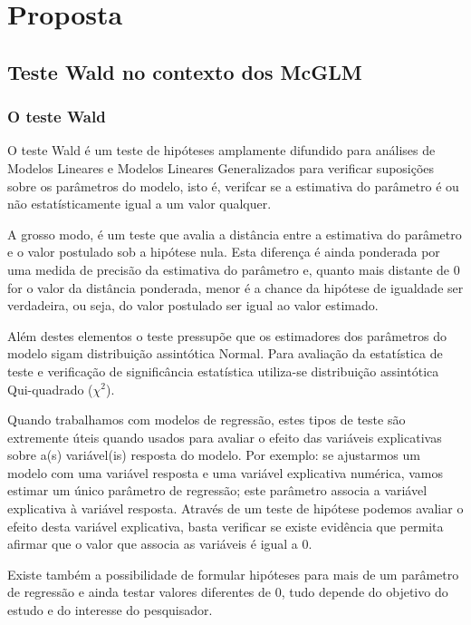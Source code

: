 
\chapter{Proposta}

\label{cap:proposta}

\section{Teste Wald no contexto dos McGLM}


\subsection{O teste Wald}

O teste Wald é um teste de hipóteses amplamente difundido para análises de Modelos Lineares e Modelos Lineares Generalizados para verificar suposições sobre os parâmetros do modelo, isto é, verifcar se a estimativa do parâmetro é ou não estatísticamente igual a um valor qualquer.

A grosso modo, é um teste que avalia a distância entre a estimativa do parâmetro e o valor postulado sob a hipótese nula. Esta diferença é ainda ponderada por uma medida de precisão da estimativa do parâmetro e, quanto mais distante de 0 for o valor da distância ponderada, menor é a chance da hipótese de igualdade ser verdadeira, ou seja, do valor postulado ser igual ao valor estimado.

Além destes elementos o teste pressupõe que os estimadores dos parâmetros do modelo sigam distribuição assintótica Normal. Para avaliação da estatística de teste e verificação de significância estatística utiliza-se distribuição assintótica Qui-quadrado ($\chi^2$).

Quando trabalhamos com modelos de regressão, estes tipos de teste são extremente úteis quando usados para avaliar o efeito das variáveis explicativas sobre a(s) variável(is) resposta do modelo. Por exemplo: se ajustarmos um modelo com uma variável resposta e uma variável explicativa numérica, vamos estimar um único parâmetro de regressão; este parâmetro associa a variável explicativa à variável resposta. Através de um teste de hipótese podemos avaliar o efeito desta variável explicativa, basta verificar se existe evidência que permita afirmar que o valor que associa as variáveis é igual a 0. 

Existe também a possibilidade de formular hipóteses para mais de um parâmetro de regressão e ainda testar valores diferentes de 0, tudo depende do objetivo do estudo e do interesse do pesquisador. 

